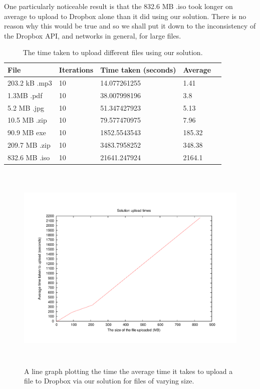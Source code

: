 \documentclass[12pt, titlepage]{article}
\begin{document}
\newline \indent One particularly noticeable result is that the 832.6 MB .iso took longer on average to upload to Dropbox alone than it did using our solution. There is no reason why this would be true and so we shall put it down to the inconsistency of the Dropbox API, and networks in general, for large files.

\bigskip
\begin{table}[H]
\begin{center}
    \begin{tabular}{ | l | l | l | l | l |}
    \hline
    \textbf{File} & \textbf{Iterations} & \textbf{Time taken (seconds)} & \textbf{Average} \\ \hline
    203.2 kB .mp3 & 10 & 14.077261255 & 1.41 \\ \hline
    1.3MB .pdf & 10 & 38.007998196 & 3.8 \\ \hline 
    5.2 MB .jpg & 10 & 51.347427923 & 5.13 \\ \hline
    10.5 MB .zip & 10 & 79.577470975 & 7.96  \\ \hline
    90.9 MB exe & 10 & 1852.5543543 & 185.32 \\ \hline
    209.7 MB .zip & 10 & 3483.7958252 & 348.38 \\ \hline
    832.6 MB .iso & 10 & 21641.247924 & 2164.1 \\ \hline
    \end{tabular}
    \caption{The time taken to upload different files using our solution.} \label{tab:uploadBenchmark}
    \end{center}
\end{table}

\begin{figure}[H]
\centerline{\includegraphics[height=4.0in,width=7in,angle=0]{plots/solutionUpload/solutionUploadTimes.pdf}}
\caption{A line graph plotting the time the average time it takes to upload a file to Dropbox via our solution for files of varying size.}
\label{fig:solutionUploadLineGraph}
\end{figure}
\end{document}
